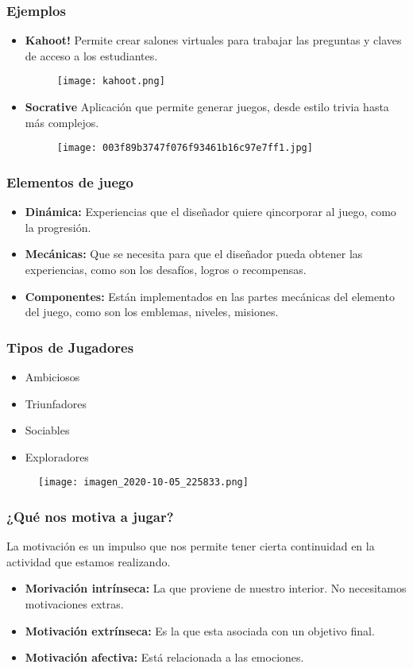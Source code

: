 \documentclass[11pt]{beamer}
\begin{document}
\begin{frame}
\frametitle{Ejemplos}
\begin{itemize}
    \item {\bf Kahoot!} Permite crear salones virtuales para trabajar las preguntas y claves de acceso a los estudiantes.
    \begin{figure}
    \texttt{[image: kahoot.png]}
    \label{fig:my_label}
\end{figure}
    \item {\bf Socrative} Aplicación que permite generar juegos, desde estilo trivia hasta más complejos.
    \begin{figure}
    \texttt{[image: 003f89b3747f076f93461b16c97e7ff1.jpg]}
    \label{fig:my_label}
\end{figure}
\end{itemize}
\end{frame}

\begin{frame}
\frametitle{Elementos de juego}
\begin{itemize}
    \item {\bf Dinámica:} Experiencias que el diseñador quiere qincorporar al juego, como la progresión.
    \item {\bf Mecánicas:} Que se necesita para que el diseñador pueda obtener las experiencias, como son los desafíos, logros o recompensas.
    \item {\bf Componentes:} Están implementados en las partes mecánicas del elemento del juego, como son los emblemas, niveles, misiones.
\end{itemize}
\end{frame}

\begin{frame}
\frametitle{Tipos de Jugadores}
\begin{itemize}
    \item  Ambiciosos
    \item Triunfadores
    \item Sociables
    \item Exploradores
\end{itemize}
\begin{figure}
    \centering
    \texttt{[image: imagen\_2020-10-05\_225833.png]}
    \label{fig:my_label}
\end{figure}
\end{frame}

\begin{frame}
\frametitle{¿Qué nos motiva a jugar?}
La motivación es un impulso que nos permite tener cierta continuidad en la actividad que estamos realizando.\\
\begin{itemize}
    \item {\bf Morivación intrínseca: } La que proviene de nuestro interior. No necesitamos motivaciones extras.
    \item {\bf Motivación extrínseca: } Es la que esta asociada con un objetivo final.
    \item {\bf Motivación afectiva: } Está relacionada a las emociones.
\end{itemize}
\end{frame}
\end{document}
